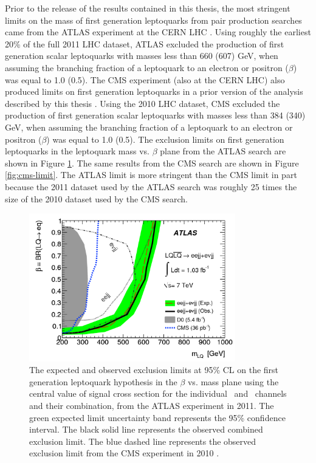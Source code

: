 Prior to the release of the results contained in this thesis, 
the most stringent limits on the mass of first generation leptoquarks from pair production searches
came from the ATLAS experiment at the CERN LHC \cite{pair-lq1-ATLAS}.
Using roughly the earliest 20\% of the full 2011 LHC dataset, 
ATLAS excluded the production of first generation scalar leptoquarks
with masses less than 660 (607) GeV, when assuming the branching fraction
of a leptoquark to an electron or positron ($\beta$) was equal to 1.0 (0.5).
The CMS experiment (also at the CERN LHC) also produced limits on first generation
leptoquarks in a prior version of the analysis described by this thesis \cite{lq1-paolo,lq1-dinko}.
Using the 2010 LHC dataset, CMS excluded the production of first generation scalar leptoquarks
with masses less than 384 (340) GeV, when assuming the branching fraction
of a leptoquark to an electron or positron ($\beta$) was equal to 1.0 (0.5).
The exclusion limits on first generation leptoquarks in the leptoquark mass vs. $\beta$ plane
from the ATLAS search are shown in Figure \ref{fig:atlas-limit}.
The same results from the CMS search are shown in Figure \ref{fig:cms-limit}.
The ATLAS limit is more stringent than the CMS limit in part because the 2011 dataset used by the ATLAS
search was roughly 25 times the size of the 2010 dataset used by the CMS search.

\begin{figure}
  \centering
  \includegraphics[width=0.80\textwidth]{tex/theory/fig/limits/ATLAS-2011.png}
  \caption{
    The expected and observed exclusion limits at 95\% CL on the first generation leptoquark
    hypothesis in the $\beta$ vs. mass plane using the central value of signal cross section for the
    individual \eejj~and \enujj~channels and their combination, from the ATLAS experiment in 2011.  The green expected
    limit uncertainty band represents the 95\% confidence interval.  The black solid line represents
    the observed combined exclusion limit.  
    The blue dashed line represents the observed exclusion limit from the CMS experiment in 2010 \cite{pair-lq1-ATLAS}.
  }
  \label{fig:atlas-limit}
\end{figure}

